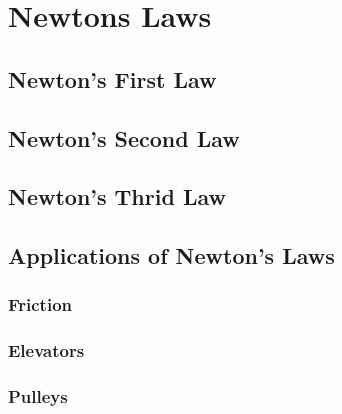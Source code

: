 \chapter{Newtons Laws}
	\section{Newton's First Law}
	\section{Newton's Second Law}
	\section{Newton's Thrid Law}
	\section{Applications of Newton's Laws}
		\subsection{Friction}
		\subsection{Elevators}
		\subsection{Pulleys}
		


	


